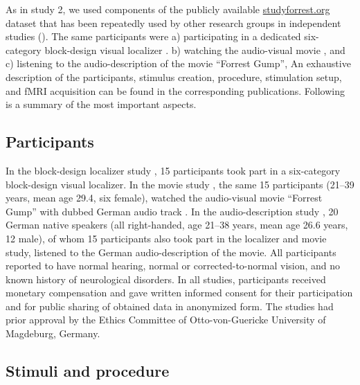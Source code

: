 As in study 2, we
%
used components of the publicly available
\href{http://www.studyforrest.org}{studyforrest.org} dataset that has been
repeatedly used by other research groups in independent studies
(\citep[e.g.,][]{ben2018hippocampal, jiahui2020predicting, hu2017decoding,
lettieri2019emotionotopy, nguyen2016integration}).
The same participants were
a) participating in a dedicated six-category block-design visual localizer
\citep{sengupta2016extension}.
b) watching the audio-visual movie \citep{hanke2016simultaneous}, and
c) listening to the audio-description \citep{hanke2014audiomovie} of the movie
``Forrest Gump'',
An exhaustive description of the participants, stimulus creation, procedure,
stimulation setup, and fMRI acquisition can be found in the corresponding
publications. Following is a summary of the most important aspects.


\subsection{Participants}

In the block-design localizer study \citep{sengupta2016extension}, 15
participants took part in a six-category block-design visual localizer.
In the movie study \citep{hanke2016simultaneous}, the same 15 participants
(21–39 years, mean age 29.4, six female), watched the audio-visual movie
``Forrest Gump'' \citep{ForrestGumpMovie} with dubbed German audio track
\citep{ForrestGumpDVD}.
In the audio-description study \citep{hanke2014audiomovie}, 20 German native
speakers (all right-handed, age 21–38 years, mean age 26.6 years, 12 male), of
whom 15 participants also took part in the localizer and movie study, listened
to the German audio-description \citep{ForrestGumpGermanAD} of the movie.
All participants reported to have normal hearing, normal or corrected-to-normal
vision, and no known history of neurological disorders.
In all studies, participants received monetary compensation and gave written
informed consent for their participation and for public sharing of obtained data
in anonymized form. The studies had prior approval by the Ethics Committee of
Otto-von-Guericke University of Magdeburg, Germany.


\subsection{Stimuli and procedure}

